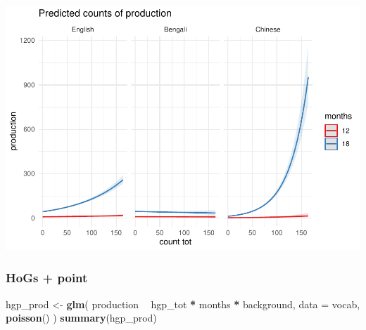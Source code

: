 \documentclass[]{article}
\newenvironment{Shaded}{\begin{snugshade}}{\end{snugshade}}
\newcommand{\DataTypeTok}[1]{\textcolor[rgb]{0.13,0.29,0.53}{#1}}
\newcommand{\KeywordTok}[1]{\textcolor[rgb]{0.13,0.29,0.53}{\textbf{#1}}}
\newcommand{\NormalTok}[1]{#1}
\newcommand{\OperatorTok}[1]{\textcolor[rgb]{0.81,0.36,0.00}{\textbf{#1}}}
\newcommand{\StringTok}[1]{\textcolor[rgb]{0.31,0.60,0.02}{#1}}
\begin{document}
\includegraphics{supplement_files/figure-latex/all-gest-lm-2-undsay-plot-1.pdf}

\hypertarget{hogs-point}{%
\subsubsection{HoGs + point}\label{hogs-point}}

\begin{Shaded}
\begin{Highlighting}[]
\NormalTok{hgp_prod <-}\StringTok{ }\KeywordTok{glm}\NormalTok{(}
\NormalTok{  production }\OperatorTok{~}
\StringTok{    }\NormalTok{hgp_tot }\OperatorTok{*}
\StringTok{    }\NormalTok{months }\OperatorTok{*}
\StringTok{    }\NormalTok{background,}
  \DataTypeTok{data =}\NormalTok{ vocab,}
  \KeywordTok{poisson}\NormalTok{()}
\NormalTok{)}
\KeywordTok{summary}\NormalTok{(hgp_prod)}
\end{Highlighting}
\end{Shaded}
\end{document}
